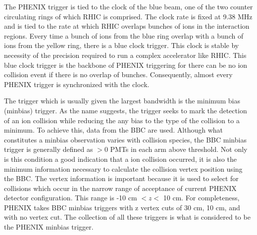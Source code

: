 The PHENIX trigger is tied to the clock of the blue beam, one of the two counter circulating rings of which RHIC is comprised. The clock rate is fixed at 9.38 MHz and is tied to the rate at which RHIC overlaps bunches of ions in the interaction regions. Every time a bunch of ions from the blue ring overlap with a bunch of ions from the yellow ring, there is a blue clock trigger. This clock is stable by necessity of the precision required to run a complex accelerator like RHIC. This blue clock trigger is the backbone of PHENIX triggering for there can be no ion collision event if there is no overlap of bunches. Consequently, almost every PHENIX trigger is synchronized with the clock.

The trigger which is usually given the largest bandwidth is the minimum bias (minbias) trigger. As the name suggests, the trigger seeks to mark the detection of an ion collision while reducing the any bias to the type of the collision to a minimum. To achieve this, data from the BBC are used. Although what constitutes a minbias observation varies with collision species, the BBC minbias trigger is generally defined as $>$0 PMTs in each arm above threshold. Not only is this condition a good indication that a ion collision occurred, it is also the minimum information necessary to calculate the collision vertex position using the BBC. The vertex information is important because it is used to select for collisions which occur in the narrow range of acceptance of current PHENIX detector configuration. This range is -10 cm $< z<$ 10 cm. For completeness, PHENIX takes BBC minbias triggers with z vertex cuts of 30 cm, 10 cm, and with no vertex cut. The collection of all these triggers is what is considered to be the PHENIX minbias trigger.

